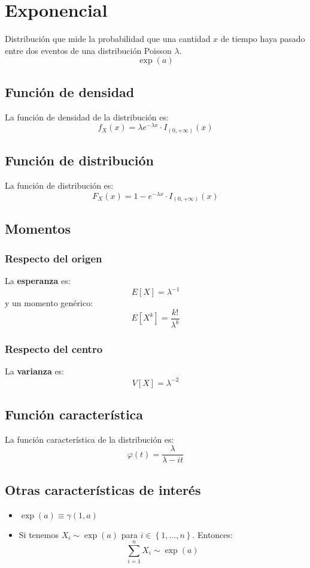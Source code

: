 \section{Exponencial}
\label{sec:exponencial}
Distribución que mide la probabilidad que una cantidad $x$ de tiempo haya pasado entre 
dos eventos de una distribución Poisson $\lambda$.
\[
\boxed{\exp\left( a \right)}
\]

\subsection{Función de densidad}
La función de densidad de la distribución es:
\[
f_X \left( x \right) = \lambda e^{-\lambda x} \cdot I_{\left( 0, +\infty \right)}\left( x \right)
\]

\subsection{Función de distribución}
La función de distribución es:
\[
F_X\left( x \right) = 1 - e^{-\lambda x} \cdot I_{\left( 0, +\infty \right)}\left( x \right)
\]

\subsection{Momentos}

\subsubsection*{Respecto del origen}
La \textbf{esperanza} es: 
\[
    E\left[ X \right] = \lambda^{-1}
\]
y un momento genérico: 
\[
    E\left[ X^k \right] = \frac{k!}{\lambda^k}
\]
\subsubsection*{Respecto del centro}
La \textbf{varianza} es:
\[
    V\left[ X \right] = \lambda^{-2}
\]

\subsection{Función característica}
La función característica de la distribución es:
\[
\varphi\left( t \right) = \frac{\lambda}{\lambda - it}
\]

\subsection{Otras características de interés}
\begin{itemize}
    \item $\exp\left( a \right) \equiv \gamma\left( 1, a \right)$
    \item Si tenemos $X_i \sim \exp\left( a \right)$ para $i \in \left\{ 1, \ldots, n \right\}$. Entonces:
    \[
    \sum_{i=1}^{n} X_i \sim \exp \left( a \right) 
    \]
\end{itemize}
